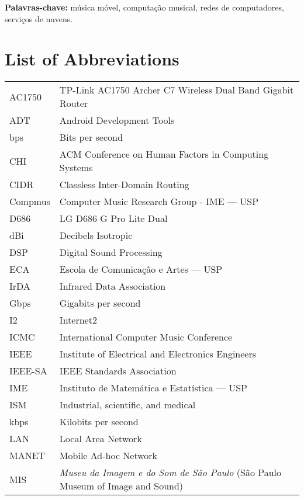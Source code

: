 \documentclass[11pt,twoside,a4paper]{book}
\begin{document}
	\noindent \textbf{Palavras-chave:} música móvel, computação musical, redes de computadores, serviços de nuvens.
	
	\tableofcontents    %
	
	\chapter{List of Abbreviations}
	\begin{longtable}{ll}
		AC1750		& TP-Link AC1750 Archer C7 Wireless Dual Band Gigabit Router\\
        ADT         & Android Development Tools\\
		bps         & Bits per second\\
		CHI		    & ACM Conference on Human Factors in Computing Systems\\
		CIDR        & Classless Inter-Domain Routing\\
		Compmus		& Computer Music Research Group - IME --- USP\\
		D686		& LG D686 G Pro Lite Dual\\
		dBi         & Decibels Isotropic\\
		DSP		    & Digital Sound Processing\\
		ECA 	    & Escola de Comunicação e Artes --- USP\\	
		IrDA        & Infrared Data Association\\
		Gbps        & Gigabits per second\\
		I2		    & Internet2\\ 
		ICMC		& International Computer Music Conference\\
		IEEE        & Institute of Electrical and Electronics Engineers\\
		IEEE-SA     & IEEE Standards Association\\
		IME		    & Instituto de Matemática e Estatística --- USP\\
		ISM         & Industrial, scientific, and medical\\
		kbps        & Kilobits per second\\
		LAN         & Local Area Network\\
		MANET       & Mobile Ad-hoc Network\\
		MIS		    & \textit{Museu da Imagem e do Som de São Paulo} (São Paulo Museum of Image and Sound)\\ 

\end{longtable}
\end{document}
